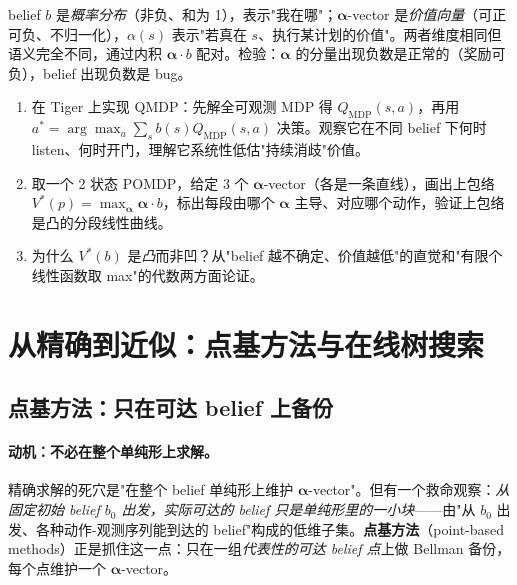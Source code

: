 \begin{pitfall}
belief $b$ 是\emph{概率分布}（非负、和为 1），表示"我在哪"；$\boldsymbol{\alpha}$-vector 是\emph{价值向量}（可正可负、不归一化），$\alpha(s)$ 表示"若真在 $s$、执行某计划的价值"。两者维度相同但语义完全不同，通过内积 $\boldsymbol{\alpha}\cdot b$ 配对。检验：$\boldsymbol{\alpha}$ 的分量出现负数是正常的（奖励可负），belief 出现负数是 bug。
\end{pitfall}

\begin{practice}
\begin{enumerate}
  \item 在 Tiger 上实现 QMDP：先解全可观测 MDP 得 $Q_{\mathrm{MDP}}(s,a)$，再用 $a^*=\arg\max_a\sum_s b(s)Q_{\mathrm{MDP}}(s,a)$ 决策。观察它在不同 belief 下何时 listen、何时开门，理解它系统性低估"持续消歧"价值。
  \item 取一个 2 状态 POMDP，给定 3 个 $\boldsymbol{\alpha}$-vector（各是一条直线），画出上包络 $V^*(p)=\max_{\boldsymbol{\alpha}}\boldsymbol{\alpha}\cdot b$，标出每段由哪个 $\boldsymbol{\alpha}$ 主导、对应哪个动作，验证上包络是凸的分段线性曲线。
  \item 为什么 $V^*(b)$ 是\emph{凸}而非凹？从"belief 越不确定、价值越低"的直觉和"有限个线性函数取 max"的代数两方面论证。
\end{enumerate}
\end{practice}

\section{从精确到近似：点基方法与在线树搜索}
\label{sec:pomdp-solve}

\subsection{点基方法：只在可达 belief 上备份}
\label{sec:pomdp-pbvi}

\paragraph{动机：不必在整个单纯形上求解。}
精确求解的死穴是"在整个 belief 单纯形上维护 $\boldsymbol{\alpha}$-vector"。但有一个救命观察：\emph{从固定初始 belief $b_0$ 出发，实际可达的 belief 只是单纯形里的一小块}——由"从 $b_0$ 出发、各种动作-观测序列能到达的 belief"构成的低维子集。\textbf{点基方法}（point-based methods）正是抓住这一点：只在一组\emph{代表性的可达 belief 点}上做 Bellman 备份，每个点维护一个 $\boldsymbol{\alpha}$-vector。

